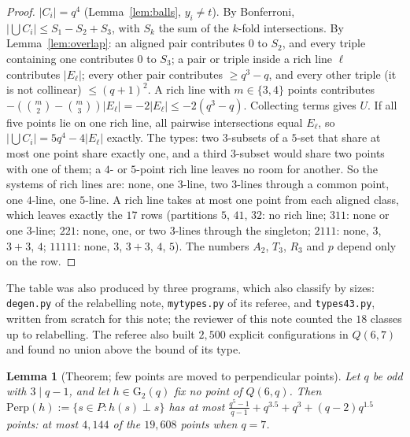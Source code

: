 \documentclass[11pt]{amsart}
\newcommand{\file}[1]{\nolinkurl{#1}}
\theoremstyle{plain}
\newtheorem{lemma}{Lemma}[section]
\theoremstyle{definition}
\theoremstyle{remark}
\newcommand{\Perp}{\mathrm{Perp}}
\newcommand{\GG}{\mathrm{G}_2}
\newcommand{\ip}{\perp}
\newcommand{\pP}{P}  %
\begin{document}
\begin{proof}
$|C_i| = q^4$ (Lemma~\ref{lem:balls}, $y_i \ne t$). By Bonferroni, $|\bigcup C_i| \le S_1 - S_2 + S_3$, with $S_k$ the
sum of the $k$-fold intersections. By Lemma~\ref{lem:overlap}: an aligned pair contributes $0$ to $S_2$, and every triple
containing one contributes $0$ to $S_3$; a pair or triple inside a rich line $\ell$ contributes $|E_\ell|$; every other
pair contributes $\ge q^3 - q$, and every other triple (it is not collinear) $\le (q+1)^2$. A rich line with
$m \in \{3,4\}$ points contributes $-(\binom m2 - \binom m3)|E_\ell| = -2|E_\ell| \le -2(q^3 - q)$. Collecting terms gives
$U$. If all five points lie on one rich line, all pairwise intersections equal $E_\ell$, so
$|\bigcup C_i| = 5q^4 - 4|E_\ell|$ exactly. The types: two $3$-subsets of a $5$-set that share at most one point share
exactly one, and a third $3$-subset would share two points with one of them; a $4$- or $5$-point rich line leaves no room
for another. So the systems of rich lines are: none, one $3$-line, two $3$-lines through a common point, one $4$-line,
one $5$-line. A rich line takes at most one point from each aligned class, which leaves exactly the $17$ rows (partitions
$5$, $41$, $32$: no rich line; $311$: none or one $3$-line; $221$: none, one, or two $3$-lines through the singleton;
$2111$: none, $3$, $3+3$, $4$; $11111$: none, $3$, $3+3$, $4$, $5$). The numbers $A_2$, $T_3$, $R_3$ and $p$ depend only
on the row.
\end{proof}

The table was also produced by three programs, which also classify by sizes: \file{degen.py} of the relabelling note,
\file{mytypes.py} of its referee, and \file{types43.py}, written from scratch for this note; the reviewer of this note
counted the $18$ classes up to relabelling. The referee also built $2{,}500$ explicit
configurations in $Q(6,7)$ and found no union above the bound of its type.

\begin{lemma}[Theorem; few points are moved to perpendicular points]\label{lem:perpbound}
Let $q$ be odd with $3 \mid q - 1$, and let $h \in \GG(q)$ fix no point of $Q(6,q)$. Then
$\Perp(h) := \{s \in \pP : h(s) \ip s\}$ has at most
$\frac{q^5 - 1}{q - 1} + q^{3.5} + q^3 + (q-2)q^{1.5}$ points: at most $4{,}144$ of the $19{,}608$ points when $q = 7$.
\end{lemma}
\end{document}
